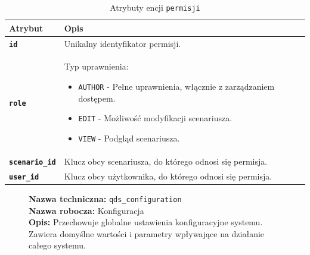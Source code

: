 \begin{table}[H]
    \centering
    \renewcommand{\arraystretch}{1.6}
    \begin{tabular}{|>{\bfseries}l|p{}|}
        \hline
        \rowcolor[HTML]{EFEFEF} \textbf{Atrybut} & \textbf{Opis} \\
        \hline
        \texttt{id} & Unikalny identyfikator permisji. \\
        \hline
        \texttt{role} & Typ uprawnienia:
        \begin{itemize}
            \item \texttt{AUTHOR} - Pełne uprawnienia, włącznie z zarządzaniem dostępem.
            \item \texttt{EDIT} - Możliwość modyfikacji scenariusza.
            \item \texttt{VIEW} - Podgląd scenariusza.
        \end{itemize} \\
        \hline
        \texttt{scenario\_id} & Klucz obcy scenariusza, do którego odnosi się permisja. \\
        \hline
        \texttt{user\_id} & Klucz obcy użytkownika, do którego odnosi się permisja. \\
        \hline
    \end{tabular}
    \caption{Atrybuty encji \texttt{permisji}}
\end{table}

\begin{figure}[H]
    \centering
    \begin{minipage}{0.8\textwidth}
        \begin{framed}
            \noindent\textbf{\large Nazwa techniczna:} \texttt{qds\_configuration} \\
            \textbf{\large Nazwa robocza:} Konfiguracja \\
            \textbf{\large Opis:} Przechowuje globalne ustawienia konfiguracyjne systemu. Zawiera domyślne wartości
            i parametry wpływające na działanie całego systemu.
        \end{framed}
    \end{minipage}
\end{figure}

